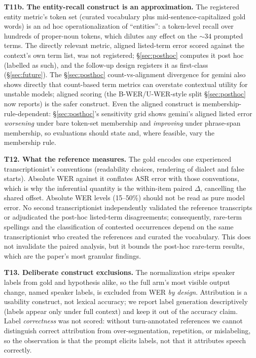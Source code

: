 \documentclass[11pt]{article}
\begin{document}
\textbf{T11b. The entity-recall construct is an approximation.} The registered entity metric's token set (curated vocabulary plus mid-sentence-capitalized gold words) is an ad hoc operationalization of ``entities'': a token-level recall over hundreds of proper-noun tokens, which dilutes any effect on the ${\sim}34$ prompted terms. The directly relevant metric, aligned listed-term error scored against the context's own term list, was not registered; \S\ref{sec:posthoc} computes it post hoc (labelled as such), and the follow-up design registers it as first-class (\S\ref{sec:future}). The \S\ref{sec:posthoc} count-vs-alignment divergence for gemini also shows directly that count-based term metrics can overstate contextual utility for unstable models; aligned scoring (the B-WER/U-WER-style split \S\ref{sec:posthoc} now reports) is the safer construct. Even the aligned construct is membership-rule-dependent: \S\ref{sec:posthoc}'s sensitivity grid shows gemini's aligned listed error \emph{worsening} under bare token-set membership and \emph{improving} under phrase-span membership, so evaluations should state and, where feasible, vary the membership rule.

\textbf{T12. What the reference measures.} The gold encodes one experienced transcriptionist's conventions (readability choices, rendering of dialect and false starts). Absolute WER against it conflates ASR error with those conventions, which is why the inferential quantity is the within-item paired $\Delta$, cancelling the shared offset. Absolute WER levels (15--50\%) should not be read as pure model error. No second transcriptionist independently validated the reference transcripts or adjudicated the post-hoc listed-term disagreements; consequently, rare-term spellings and the classification of contested occurrences depend on the same transcriptionist who created the references and curated the vocabulary. This does not invalidate the paired analysis, but it bounds the post-hoc rare-term results, which are the paper's most granular findings.

\textbf{T13. Deliberate construct exclusions.} The normalization strips speaker labels from gold and hypothesis alike, so the full arm's most visible output change, named speaker labels, is excluded from WER \emph{by design}. Attribution is a usability construct, not lexical accuracy; we report label generation descriptively (labels appear only under full context) and keep it out of the accuracy claim. Label \emph{correctness} was not scored: without turn-annotated references we cannot distinguish correct attribution from over-segmentation, repetition, or mislabeling, so the observation is that the prompt elicits labels, not that it attributes speech correctly.
\end{document}
